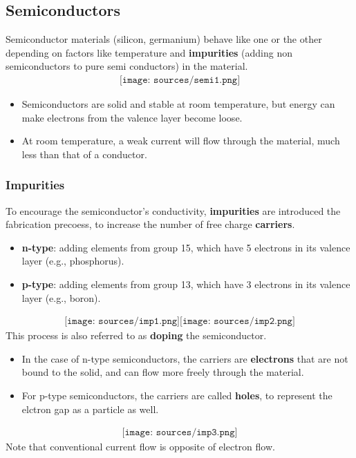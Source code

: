 \documentclass[12pt]{article}
\theoremstyle{definition}
\begin{document}
\subsection{Semiconductors}
Semiconductor materials (silicon, germanium) behave like one or the other depending on factors like temperature and \textbf{impurities} (adding non semiconductors to pure semi conductors) in the material.
\begin{align*}
    \texttt{[image: sources/semi1.png]}
\end{align*}
\begin{itemize}
    \item Semiconductors are solid and stable at room temperature, but energy can make electrons from the valence layer become loose.
    \item At room temperature, a weak current will flow through the material, much less than that of a conductor.
\end{itemize}
\subsubsection{Impurities}
To encourage the semiconductor's conductivity, \textbf{impurities} are introduced the fabrication precoess, to increase the number of free charge \textbf{carriers}.
\begin{itemize}
    \item \textbf{n-type}: adding elements from group 15, which have 5 electrons in its valence layer (e.g., phosphorus).
    \item \textbf{p-type}: adding elements from group 13, which have 3 electrons in its valence layer (e.g., boron).
\end{itemize}
\begin{align*}
    \texttt{[image: sources/imp1.png]}
    \texttt{[image: sources/imp2.png]}
\end{align*}
This process is also referred to as \textbf{doping} the semiconductor.
\begin{itemize}
    \item In the case of n-type semiconductors, the carriers are \textbf{electrons} that are not bound to the solid, and can flow more freely through the material.
    \item For p-type semiconductors, the carriers are called \textbf{holes}, to represent the elctron gap as a particle as well.
\end{itemize}
\begin{align*}
    \texttt{[image: sources/imp3.png]}
\end{align*}
Note that conventional current flow is opposite of electron flow.
\end{document}
